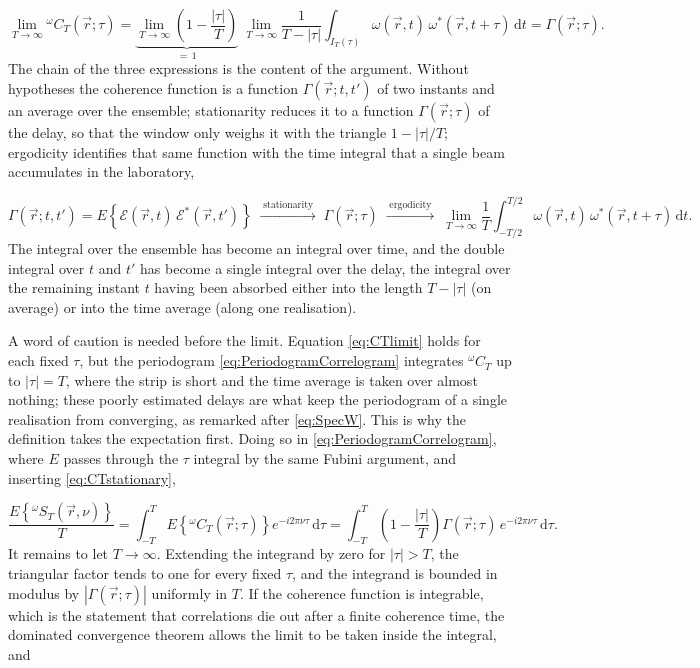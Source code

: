 		\begin{equation}\label{eq:CTlimit}
			\lim_{T\to\infty}{}^{\omega}C_{T}(\vec{r};\tau)
			= \underbrace{\lim_{T\to\infty}\left(1-\frac{|\tau|}{T}\right)}_{=\,1}\;\lim_{T\to\infty}\frac{1}{T-|\tau|}\int_{I_{T}(\tau)}\omega(\vec{r},t)\,\omega^{*}(\vec{r},t+\tau)\,\mathrm{d}t
			= \Gamma(\vec{r};\tau) .
		\end{equation}
		The chain of the three expressions is the content of the argument. Without hypotheses
		the coherence function is a function $\Gamma(\vec{r};t,t')$ of two instants and an
		average over the ensemble; stationarity reduces it to a function $\Gamma(\vec{r};\tau)$
		of the delay, so that the window only weighs it with the triangle $1-|\tau|/T$;
		ergodicity identifies that same function with the time integral that a single beam
		accumulates in the laboratory,

		\begin{equation}
			\Gamma(\vec{r};t,t') = E\left\{\mathcal{E}(\vec{r},t)\,\mathcal{E}^{*}(\vec{r},t')\right\}
			\;\xrightarrow{\;\text{stationarity}\;}\;
			\Gamma(\vec{r};\tau)
			\;\xrightarrow{\;\text{ergodicity}\;}\;
			\lim_{T\to\infty}\frac{1}{T}\int_{-T/2}^{T/2}\omega(\vec{r},t)\,\omega^{*}(\vec{r},t+\tau)\,\mathrm{d}t .
		\end{equation}
		The integral over the ensemble has become an integral over time, and the double integral
		over $t$ and $t'$ has become a single integral over the delay, the integral over the
		remaining instant $t$ having been absorbed either into the length $T-|\tau|$ (on average)
		or into the time average (along one realisation).

		A word of caution is needed before the limit. Equation \eqref{eq:CTlimit} holds for each
		fixed $\tau$, but the periodogram \eqref{eq:PeriodogramCorrelogram} integrates
		${}^{\omega}C_{T}$ up to $|\tau|=T$, where the strip is short and the time average is
		taken over almost nothing; these poorly estimated delays are what keep the periodogram of
		a single realisation from converging, as remarked after \eqref{eq:SpecW}. This is why the
		definition takes the expectation first. Doing so in \eqref{eq:PeriodogramCorrelogram},
		where $E$ passes through the $\tau$ integral by the same Fubini argument, and inserting
		\eqref{eq:CTstationary},

		\begin{equation}
			\frac{E\left\{{}^\omega S_{T}(\vec{r},\nu)\right\}}{T}
			= \int_{-T}^{T}E\left\{{}^{\omega}C_{T}(\vec{r};\tau)\right\}e^{-i2\pi\nu\tau}\,\mathrm{d}\tau
			= \int_{-T}^{T}\left(1-\frac{|\tau|}{T}\right)\Gamma(\vec{r};\tau)\,e^{-i2\pi\nu\tau}\,\mathrm{d}\tau .
		\end{equation}
		It remains to let $T\to\infty$. Extending the integrand by zero for $|\tau|>T$, the
		triangular factor tends to one for every fixed $\tau$, and the integrand is bounded in
		modulus by $|\Gamma(\vec{r};\tau)|$ uniformly in $T$. If the coherence function is
		integrable, which is the statement that correlations die out after a finite coherence
		time, the dominated convergence theorem allows the limit to be taken inside the integral,
		and

